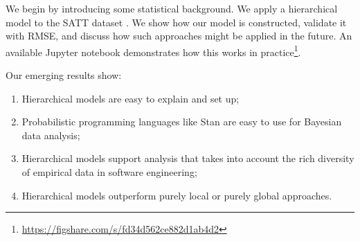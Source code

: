 \documentclass[sigconf,natbib=false]{acmart}
\begin{document}
We begin by introducing some statistical background. %
We apply a hierarchical model to the SATT dataset  \cite{Aniche2016}. We show how our model is constructed, validate it with RMSE, and discuss how such approaches might be applied in the future. An available Jupyter notebook demonstrates how this works in practice\footnote{\url{https://figshare.com/s/fd34d562ce882d1ab4d2}}.

Our emerging results show:
\begin{enumerate}
	\item Hierarchical models are easy to explain and set up;
	\item Probabilistic programming languages like Stan are easy to use for Bayesian data analysis;
	\item Hierarchical models support analysis that takes into account the rich diversity of empirical data in software engineering;
	\item Hierarchical models outperform purely local or purely global approaches.
\end{enumerate}

\end{document}
